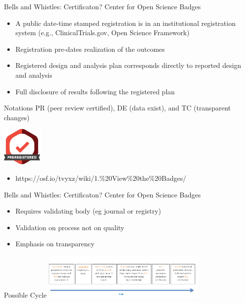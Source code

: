 \documentclass[
  11pt,
  ignorenonframetext,
]{beamer}
\providecommand{\tightlist}{%
  \setlength{\itemsep}{0pt}\setlength{\parskip}{0pt}}\usepackage{longtable,booktabs,array}
\begin{document}
\begin{frame}{Bells and Whistles: Certificaton?}
\protect\hypertarget{bells-and-whistles-certificaton}{}
Center for Open Science Badges

\begin{itemize}
\tightlist
\item
  A public date-time stamped registration is in an institutional
  registration system (e.g., ClinicalTrials.gov, Open Science Framework)
\item
  Registration pre-dates realization of the outcomes
\item
  Registered design and analysis plan corresponds directly to reported
  design and analysis
\item
  Full disclosure of results following the registered plan
\end{itemize}

Notations PR (peer review certified), DE (data exist), and TC
(transparent changes)

\includegraphics[width=0.8in,height=\textheight]{assets/badge.png}

\begin{itemize}
\tightlist
\item
  https://osf.io/tvyxz/wiki/1.\%20View\%20the\%20Badges/
\end{itemize}
\end{frame}

\begin{frame}{Bells and Whistles: Certificaton?}
\protect\hypertarget{bells-and-whistles-certificaton-1}{}
Center for Open Science Badges

\begin{itemize}
\tightlist
\item
  Requires validating body (eg journal or registry)
\item
  Validation on process not on quality
\item
  Emphasis on transparency
\end{itemize}
\end{frame}

\begin{frame}{Possible Cycle}
\protect\hypertarget{possible-cycle}{}
\includegraphics[width=3.18in,height=\textheight]{assets/cycle.png}
\end{frame}
\end{document}
